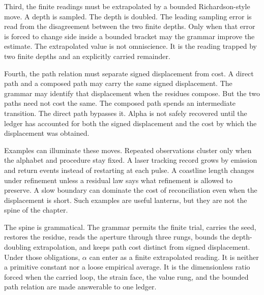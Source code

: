 Third, the finite readings must be extrapolated by a bounded Richardson-style
move. A depth is sampled. The depth is doubled. The leading sampling error is
read from the disagreement between the two finite depths. Only when that error
is forced to change side inside a bounded bracket may the grammar improve the
estimate. The extrapolated value is not omniscience. It is the reading trapped
by two finite depths and an explicitly carried remainder.

Fourth, the path relation must separate signed displacement from cost. A
direct path and a composed path may carry the same signed displacement. The
grammar may identify that displacement when the residues compose. But the two
paths need not cost the same. The composed path spends an intermediate
transition. The direct path bypasses it. Alpha is not safely recovered until
the ledger has accounted for both the signed displacement and the cost by
which the displacement was obtained.

Examples can illuminate these moves. Repeated observations cluster only when
the alphabet and procedure stay fixed. A laser tracking record grows by
emission and return events instead of restarting at each pulse. A coastline
length changes under refinement unless a residual law says what refinement is
allowed to preserve. A slow boundary can dominate the cost of reconciliation
even when the displacement is short. Such examples are useful lanterns, but
they are not the spine of the chapter.

The spine is grammatical. The grammar permits the finite trial, carries the
seed, restores the residue, reads the aperture through three rungs, bounds the
depth-doubling extrapolation, and keeps path cost distinct from signed
displacement. Under those obligations, \(\alpha\) can enter as a finite
extrapolated reading. It is neither a primitive constant nor a loose empirical
average. It is the dimensionless ratio forced when the carried loop, the
strain face, the value rung, and the bounded path relation are made answerable
to one ledger.
